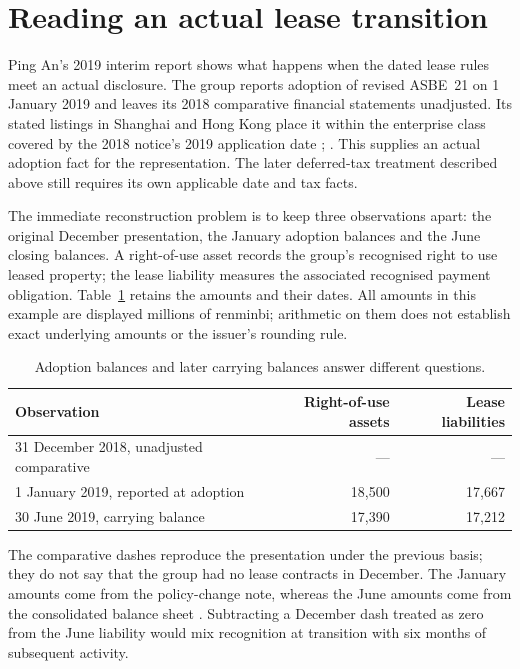 \clearpage
\section{Reading an actual lease transition}
\label{sec:pingan-lease-transition}

Ping An's 2019 interim report shows what happens when the dated lease rules
meet an actual disclosure. The group reports adoption of revised ASBE~21 on
1 January 2019 and leaves its 2018 comparative financial statements
unadjusted. Its stated listings in Shanghai and Hong Kong place it within
the enterprise class covered by the 2018 notice's 2019 application date
\citep[pp.\ 112--113]{pingan2019asbe};
\citep[notice, para.\ I]{moflease2018}. This supplies an actual adoption
fact for the representation. The later deferred-tax treatment described
above still requires its own applicable date and tax facts.

The immediate reconstruction problem is to keep three observations apart:
the original December presentation, the January adoption balances and the
June closing balances. A right-of-use asset records the group's recognised
right to use leased property; the lease liability measures the associated
recognised payment obligation. Table~\ref{tab:pingan-lease-balances} retains
the amounts and their dates. All amounts in this example are displayed
millions of renminbi; arithmetic on them does not establish exact underlying
amounts or the issuer's rounding rule.

\begin{table}[!ht]
\centering
\caption{Adoption balances and later carrying balances answer different questions.}
\label{tab:pingan-lease-balances}
\begin{tabular}{@{}lrr@{}}
\toprule
Observation & Right-of-use assets & Lease liabilities \\
\midrule
31 December 2018, unadjusted comparative & --- & --- \\
1 January 2019, reported at adoption & 18,500 & 17,667 \\
30 June 2019, carrying balance & 17,390 & 17,212 \\
\bottomrule
\end{tabular}
\end{table}

The comparative dashes reproduce the presentation under the previous basis;
they do not say that the group had no lease contracts in December. The
January amounts come from the policy-change note, whereas the June amounts
come from the consolidated balance sheet
\citep[pp.\ 99--100, 112]{pingan2019asbe}. Subtracting a December dash
treated as zero from the June liability would mix recognition at transition
with six months of subsequent activity.

